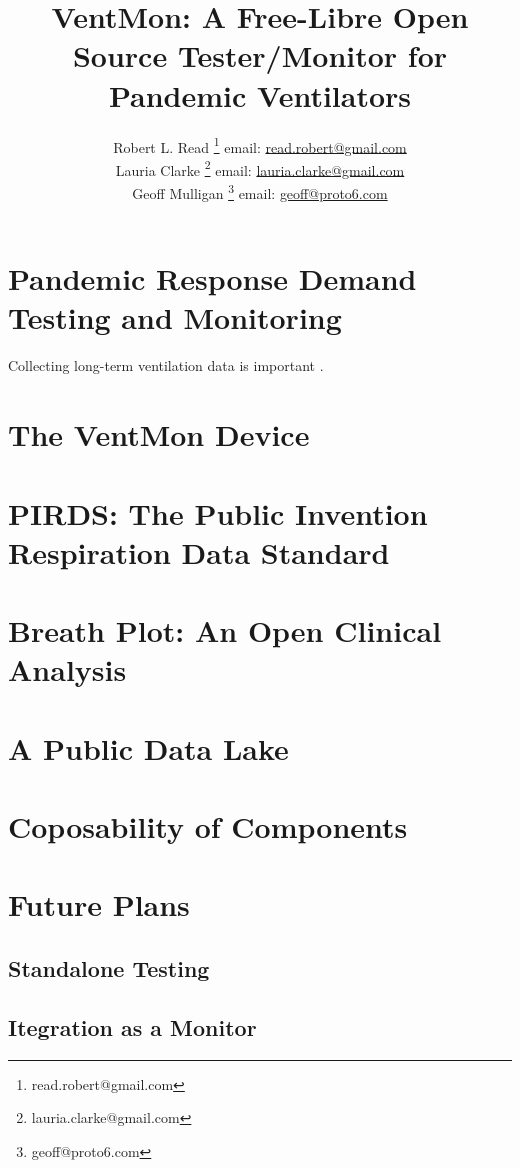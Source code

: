 \documentclass{article}
\title{VentMon: A Free-Libre Open Source Tester/Monitor for Pandemic Ventilators}
\author{Robert L. Read
  \thanks{read.robert@gmail.com}
  email: \href{mailto:read.robert@gmail.com}{read.robert@gmail.com}\\
Lauria Clarke
  \thanks{lauria.clarke@gmail.com}
  email: \href{mailto:lauria.clarke@gmail.com}{lauria.clarke@gmail.com}\\
  Geoff Mulligan
  \thanks{geoff@proto6.com }
  email: \href{mailto:geoff@proto6.com }{geoff@proto6.com}
  }
\begin{document}
\maketitle
\begin{abstract}

\end{abstract}


\section{Pandemic Response Demand Testing and Monitoring}

Collecting long-term ventilation data is important
\cite{rehm2018development}.

\section{The VentMon Device}

\section{PIRDS: The Public Invention Respiration Data Standard}

\section{Breath Plot: An Open Clinical Analysis}

\section{A Public Data Lake}

\section{Coposability of Components}

\section{Future Plans}

\subsection{Standalone Testing}

\subsection{Itegration as a Monitor}
\end{document}
